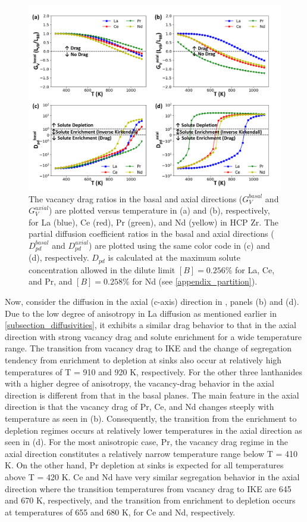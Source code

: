 \documentclass[preprint,12pt]{elsarticle}
\begin{document}
\begin{figure}[h!]
    \centering
    \includegraphics[width=\textwidth]{drag_pdc_basal_axial_updated.jpg}
    \caption{The vacancy drag ratios in the basal and axial directions ($G_V^{basal}$ and $G_V^{axial}$) are plotted versus temperature in (a) and (b), respectively, for La (blue), Ce (red), Pr (green), and Nd (yellow) in HCP Zr. The partial diffusion coefficient ratios in the basal and axial directions ($D_{pd}^{basal}$ and $D_{pd}^{axial}$) are plotted using the same color code in (c) and (d), respectively. $D_{pd}$ is calculated at the maximum solute concentration allowed in the dilute limit $[B] = 0.256 \%$ for La, Ce, and Pr, and $[B] = 0.258 \%$ for Nd (see \ref{appendix_partition}).}
    \label{fig:drag_ratios}
\end{figure}

Now, consider the diffusion in the axial (c-axis) direction in , panels (b) and (d). Due to the low degree of anisotropy in La diffusion as mentioned earlier in \cref{subsection_diffusivities}, it exhibits a similar drag behavior to that in the axial direction with strong vacancy drag and solute enrichment for a wide temperature range. The transition from vacancy drag to IKE and the change of segregation tendency from enrichment to depletion at sinks also occur at relatively high temperatures of T = 910 and 920 K, respectively. For the other three lanthanides with a higher degree of anisotropy, the vacancy-drag behavior in the axial direction is different from that in the basal planes. The main feature in the axial direction is that the vacancy drag of Pr, Ce, and Nd changes steeply with temperature as seen in (b). Consequently, the transition from the enrichment to depletion regimes occurs at relatively lower temperatures in the axial direction as seen in (d). For the most anisotropic case, Pr, the vacancy drag regime in the axial direction constitutes a relatively narrow temperature range below T = 410 K. On the other hand, Pr depletion at sinks is expected for all temperatures above T = 420 K. Ce and Nd have very similar segregation behavior in the axial direction where the transition temperatures from vacancy drag to IKE are 645 and 670 K, respectively, and the transition from enrichment to depletion occurs at temperatures of 655 and 680 K, for Ce and Nd, respectively.
\end{document}
